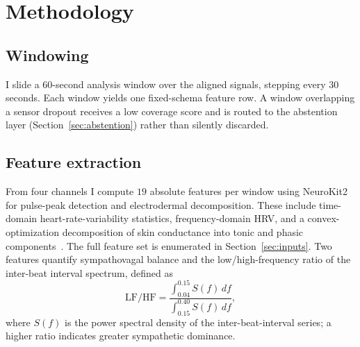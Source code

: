 \documentclass[11pt,a4paper]{article}
\begin{document}
\section{Methodology}

\subsection{Windowing}
I slide a $60$-second analysis window over the aligned signals, stepping every $30$ seconds. Each
window yields one fixed-schema feature row. A window overlapping a sensor dropout receives a low
coverage score and is routed to the abstention layer (Section~\ref{sec:abstention}) rather than
silently discarded.

\subsection{Feature extraction}
From four channels I compute $19$ absolute features per window using
NeuroKit2~\cite{makowski2021neurokit} for pulse-peak detection and electrodermal decomposition.
These include time-domain heart-rate-variability statistics, frequency-domain HRV, and a
convex-optimization decomposition of skin conductance into tonic and phasic
components~\cite{greco2016cvxeda}. The full feature set is enumerated in Section~\ref{sec:inputs}.
Two features quantify sympathovagal balance and the low/high-frequency ratio of the inter-beat
interval spectrum, defined as
\begin{equation}
\mathrm{LF/HF} = \frac{\displaystyle\int_{0.04}^{0.15} S(f)\,df}{\displaystyle\int_{0.15}^{0.40} S(f)\,df},
\end{equation}
where $S(f)$ is the power spectral density of the inter-beat-interval series; a higher ratio
indicates greater sympathetic dominance.
\end{document}
